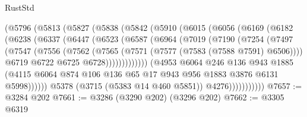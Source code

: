 \begin{lexlean}{RustStd}
\begin{coremodule}
              (@5796
                (@5813
                  (@5827
                    (@5838
                      (@5842
                        (@5910
                          (@6015
                            (@6056
                              (@6169
                                (@6182
                                  (@6238
                                    (@6337
                                      (@6447
                                        (@6523
                                          (@6587
                                            (@6964
                                              (@7019
                                                (@7190
                                                  (@7254
                                                    (@7497
                                                      (@7547
                                                        (@7556
                                                          (@7562
                                                            (@7565
                                                              (@7571
                                                                (@7577
                                                                  (@7583 (@7588 @7591) @6506))))
                                                            @6719
                                                            @6722
                                                            @6725
                                                            @6728)))))))))))))
                                  (@4953
                                    @6064
                                    @246
                                    @136
                                    @943
                                    @1885
                                    (@4115
                                      @6064
                                      @874
                                      @106
                                      @136
                                      @65
                                      @17
                                      @943
                                      @956
                                      @1883
                                      @3876
                                      @6131
                                      @5998))))))
                          @5378
                          (@3715 (@5383 @14 @460 @5851))
                          @4276)))))))))))
@7657 := @3284 @202
@7661 := @3286 (@3290 @202) (@3296 @202)
@7662 := @3305 @6319

\end{coremodule}
\end{lexlean}
